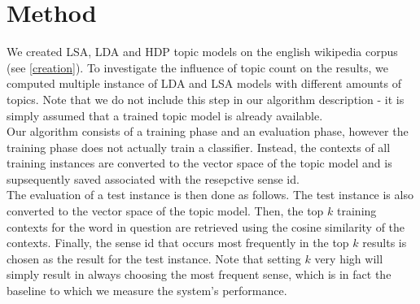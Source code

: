 \section{Method}



We created LSA, LDA and HDP topic models on the english wikipedia corpus (see \ref{creation}). To investigate the influence of topic count on the results, we  computed multiple instance of LDA and LSA models with different amounts of topics. Note that we do not include this step in our algorithm description - it is simply assumed that a trained topic model is already available.\\

Our algorithm consists of a training phase and an evaluation phase, however the training phase does not actually train a classifier. Instead, the contexts of all training instances are converted to the vector space of the topic model and is supsequently saved associated with the resepctive sense id.\\
The evaluation of a test instance is then done as follows. The test instance is also converted to the vector space of the topic model. Then, the top $k$ training contexts for the word in question are retrieved using the cosine similarity of the contexts. Finally, the sense id that occurs most frequently in the top $k$ results is chosen as the result for the test instance. Note that setting $k$ very high will simply result in always choosing the most frequent sense, which is in fact the baseline to which we measure the system's performance.\\



%

